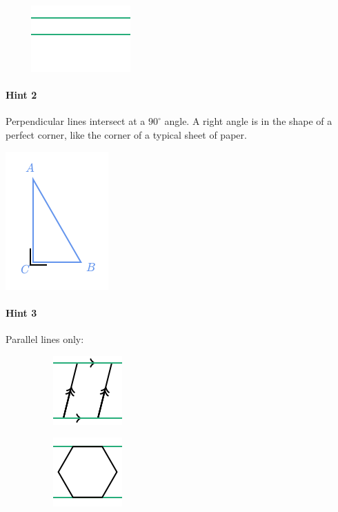 \documentclass[twocolumn,10pt]{article}
\def\shrinkfactor{0.55}
\begin{document}
$\phantom{xxxx}$
\includegraphics[scale=\shrinkfactor]{figures/7cf1fbfb7516a57d37ad80007a3886c81c33f393.png}

\paragraph{Hint 2} Perpendicular lines intersect at a $90 ^\circ$ angle.  
A right angle is in the shape of a perfect corner, like the corner of a typical sheet of paper.


\includegraphics[scale=\shrinkfactor]{figures/497661f48f441186b5e021d8ca8c4f0c7449214f.png}

\paragraph{Hint 3}Parallel lines only:

$\phantom{xxxxxxxx}$
\includegraphics[scale=\shrinkfactor]{figures/dc97e97ad57144cae5a8b5bfdc5d541d8d66aa00.png}
 
$\phantom{xxxxxxxx}$
\includegraphics[scale=\shrinkfactor]{figures/a8914ec8b688d03af4fc47bdfdb83edcce453d65.png}
\end{document}
